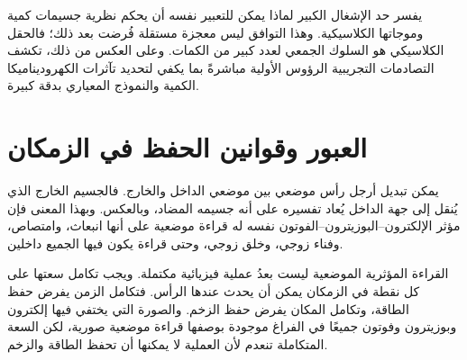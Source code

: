 يفسر حد الإشغال الكبير لماذا يمكن للتعبير نفسه أن يحكم نظرية جسيمات كمية وموجاتها الكلاسيكية. وهذا التوافق ليس معجزة مستقلة فُرضت بعد ذلك؛ فالحقل الكلاسيكي هو السلوك الجمعي لعدد كبير من الكمات. وعلى العكس من ذلك، تكشف التصادمات التجريبية الرؤوس الأولية مباشرةً بما يكفي لتحديد تآثرات الكهروديناميكا الكمية والنموذج المعياري بدقة كبيرة.

\section{العبور وقوانين الحفظ في الزمكان}

يمكن تبديل أرجل رأس موضعي بين موضعي الداخل والخارج. فالجسيم الخارج الذي يُنقل إلى جهة الداخل يُعاد تفسيره على أنه جسيمه المضاد، وبالعكس. وبهذا المعنى فإن مؤثر الإلكترون--البوزيترون--الفوتون نفسه له قراءة موضعية على أنها انبعاث، وامتصاص، وفناء زوجي، وخلق زوجي، وحتى قراءة يكون فيها الجميع داخلين.

\begin{classroomqa}
\end{classroomqa}

القراءة المؤثرية الموضعية ليست بعدُ عملية فيزيائية مكتملة. ويجب تكامل سعتها على كل نقطة في الزمكان يمكن أن يحدث عندها الرأس. فتكامل الزمن يفرض حفظ الطاقة، وتكامل المكان يفرض حفظ الزخم. والصورة التي يختفي فيها إلكترون وبوزيترون وفوتون جميعًا في الفراغ موجودة بوصفها قراءة موضعية صورية، لكن السعة المتكاملة تنعدم لأن العملية لا يمكنها أن تحفظ الطاقة والزخم.

\begin{classroomqa}
\end{classroomqa}

\begin{classroomqa}
\end{classroomqa}

